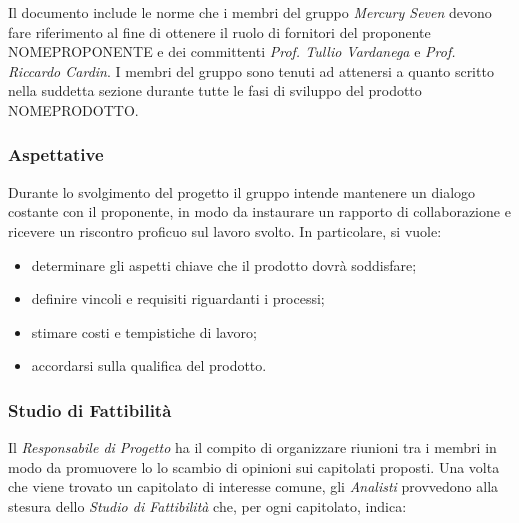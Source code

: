 Il documento include le norme che i membri del gruppo \textit{Mercury Seven } devono fare riferimento al fine di ottenere il ruolo di fornitori del proponente NOMEPROPONENTE e dei committenti \textit{Prof. Tullio Vardanega} e \textit{Prof.  Riccardo Cardin}.  I membri del gruppo sono tenuti ad attenersi a quanto scritto nella suddetta sezione durante tutte le fasi di sviluppo del prodotto NOMEPRODOTTO.

\subsubsection{Aspettative}

Durante lo svolgimento del progetto il gruppo intende mantenere un dialogo costante con il proponente,  in modo da instaurare un rapporto di collaborazione e ricevere un riscontro proficuo sul lavoro svolto.  In particolare,  si vuole:
\begin{itemize}

\item determinare gli aspetti chiave che il prodotto dovrà soddisfare;

\item definire vincoli e requisiti riguardanti i processi;

\item stimare costi e tempistiche di lavoro;

\item accordarsi sulla qualifica del prodotto.

\end{itemize}


\subsubsection{Studio di Fattibilità}

Il \textit{Responsabile di Progetto} ha il compito di organizzare riunioni tra i membri in modo da promuovere lo lo scambio di opinioni sui capitolati proposti.  Una volta che viene trovato un capitolato di interesse comune,  gli \textit{Analisti} provvedono alla stesura dello \textit{Studio di Fattibilità} che,  per ogni capitolato,  indica:

